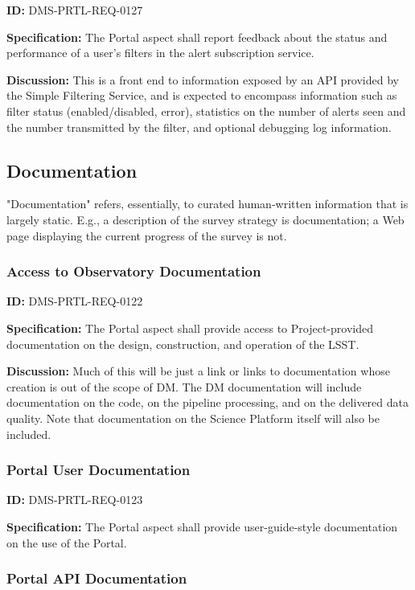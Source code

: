 \documentclass[SE,toc,lsstdraft]{lsstdoc}
\begin{document}
\label{DMS-PRTL-REQ-0127}
\textbf{ID:} DMS-PRTL-REQ-0127

\textbf{Specification:}
The Portal aspect shall report feedback about the status and performance of a user's filters in the alert subscription service.

\textbf{Discussion:}
This is a front end to information exposed by an API provided by the Simple Filtering Service, and is expected to encompass information such as filter status (enabled/disabled, error), statistics on the number of alerts seen and the number transmitted by the filter, and optional debugging log information.

\subsection{Documentation}

"Documentation" refers, essentially, to curated human-written information that is largely static.  E.g., a description of the survey strategy is documentation; a Web page displaying the current progress of the survey is not.

\subsubsection{Access to Observatory Documentation}

\label{DMS-PRTL-REQ-0122}
\textbf{ID:} DMS-PRTL-REQ-0122

\textbf{Specification:}
The Portal aspect shall provide access to Project-provided documentation on the design, construction, and operation of the LSST.

\textbf{Discussion:}
Much of this will be just a link or links to documentation whose creation is out of the scope of DM.  The DM documentation will include documentation on the code, on the pipeline processing, and on the delivered data quality.  Note that documentation on the Science Platform itself will also be included.

\subsubsection{Portal User Documentation}

\label{DMS-PRTL-REQ-0123}
\textbf{ID:} DMS-PRTL-REQ-0123

\textbf{Specification:}
The Portal aspect shall provide user-guide-style documentation on the use of the Portal.

\subsubsection{Portal API Documentation}
\end{document}
